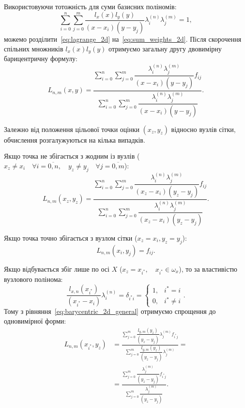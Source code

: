 Використовуючи тотожність для суми базисних поліномів:
\begin{equation}\label{eq:sum_weights_2d}
	\sum\limits_{i=0}^{n} \sum\limits_{j=0}^{m} \frac{l_x(x)l_y(y)}{(x-x_i)(y-y_j)} \lambda_i^{(n)} \lambda_j^{(m)} = 1,
\end{equation}
можемо розділити~\eqref{eq:lagrange_2d} на~\eqref{eq:sum_weights_2d}. Після скорочення спільних множників $l_x(x)l_y(y)$ отримуємо загальну другу двовимірну барицентричну формулу:
\begin{equation}\label{eq:barycentric_2d_general}
	L_{n,m}(x,y) = \frac{\sum\limits_{i=0}^{n} \sum\limits_{j=0}^{m} \dfrac{\lambda_i^{(n)} \lambda_j^{(m)}}{(x-x_i)(y-y_j)} f_{ij}}{\sum\limits_{i=0}^{n} \sum\limits_{j=0}^{m} \dfrac{\lambda_i^{(n)} \lambda_j^{(m)}}{(x-x_i)(y-y_j)}}.
\end{equation}

Залежно від положення цільової точки оцінки $(x_z, y_z)$ відносно вузлів сітки, обчислення розгалужуються на кілька випадків.

Якщо точка не збігається з жодним із вузлів ($x_z \neq x_i \quad \forall i=\overline{0,n}, \quad y_z \neq y_j \quad \forall j=\overline{0,m}$):
\begin{equation}\label{eq:barycentric_2d_xz_yz}
	L_{n,m}(x_z, y_z) = \frac{\sum\limits_{i=0}^{n} \sum\limits_{j=0}^{m} \dfrac{\lambda_i^{(n)} \lambda_j^{(m)}}{(x_z-x_i)(y_z-y_j)} f_{ij}}{\sum\limits_{i=0}^{n} \sum\limits_{j=0}^{m} \dfrac{\lambda_i^{(n)} \lambda_j^{(m)}}{(x_z-x_i)(y_z-y_j)}}.
\end{equation}

Якщо точка точно збігається з вузлом сітки ($x_z = x_i, y_z = y_j$):
\begin{equation}\label{eq:barycentric_2d_exact}
	L_{n,m}(x_i, y_j) = f_{ij}.
\end{equation}

Якщо відбувається збіг лише по осі $X$ ($x_z = x_{i^*}, \quad x_{i^*} \in \omega_x$), то за властивістю вузлового полінома:
\begin{equation*}
	\frac{l_{x,n}(x_{i^*})}{(x_{i^*} - x_i)} \lambda_i^{(n)} = \delta_{i^* i} = \begin{cases} 1, & i^*=i \\ 0, & i^* \neq i \end{cases} .
\end{equation*}
Тому з рівняння~\eqref{eq:barycentric_2d_general} отримуємо спрощення до одновимірної форми:
\begin{align}\label{eq:barycentric_2d_x_exact}
	L_{n,m}(x_{i^*}, y_z) &= \frac{\sum\limits_{j=0}^{m} \dfrac{l_{y,m}(y_z)}{(y_z - y_j)} \lambda_j^{(m)} f_{i^* j}}{\sum\limits_{j=0}^{m} \dfrac{l_{y,m}(y_z)}{(y_z - y_j)} \lambda_j^{(m)}} = \nonumber \\
	&= \frac{\sum\limits_{j=0}^{m} \dfrac{\lambda_j^{(m)}}{(y_z - y_j)} f_{i^* j}}{\sum\limits_{j=0}^{m} \dfrac{\lambda_j^{(m)}}{(y_z - y_j)}}.
\end{align}

